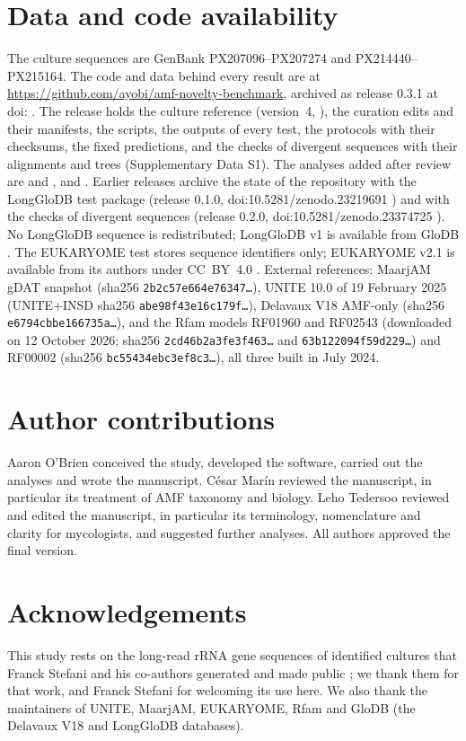 \documentclass[11pt]{article}
\begin{document}
\section*{Data and code availability}
The culture sequences are GenBank PX207096--PX207274 and PX214440--PX215164. The code and data behind every result
are at \url{https://github.com/ayobi/amf-novelty-benchmark}, archived as release 0.3.1 at doi:\ReleaseDOI{}
\cite{obrien2026zenodoc}. The release holds the culture reference (version~4, \RefFingerprint), the curation edits
and their manifests, the scripts, the outputs of every test, the protocols with their checksums, the fixed
predictions, and the checks of divergent sequences with their alignments and trees (Supplementary Data S1). The
analyses added after review are  and ,
 and . Earlier releases archive the state of the repository with the
LongGloDB test package (release 0.1.0, doi:10.5281/zenodo.23219691 \cite{obrien2026zenodo}) and with the checks of
divergent sequences (release 0.2.0, doi:10.5281/zenodo.23374725 \cite{obrien2026zenodob}). No LongGloDB sequence is
redistributed; LongGloDB v1 is available from GloDB \cite{glodb}. The EUKARYOME test stores sequence identifiers
only; EUKARYOME v2.1 is available from its authors under CC~BY~4.0 \cite{tedersoo2024eukaryome}. External references: MaarjAM
gDAT snapshot (sha256 \texttt{2b2c57e664e76347\ldots}), UNITE 10.0 of 19 February 2025 \cite{unite2025release}
(UNITE+INSD sha256 \texttt{abe98f43e16c179f\ldots}), Delavaux V18 AMF-only (sha256 \texttt{e6794cbbe166735a\ldots}),
and the Rfam models RF01960 and RF02543 (downloaded on 12 October 2026; sha256 \texttt{2cd46b2a3fe3f463\ldots} and
\texttt{63b122094f59d229\ldots}) and RF00002 (sha256 \texttt{bc55434ebc3ef8c3\ldots}), all three built in July 2024.

\section*{Author contributions}
Aaron O'Brien conceived the study, developed the software, carried out the analyses and wrote the manuscript.
C\'esar Mar\'in reviewed the manuscript, in particular its treatment of AMF taxonomy and biology. Leho Tedersoo
reviewed and edited the manuscript, in particular its terminology, nomenclature and clarity for mycologists, and
suggested further analyses. All authors approved the final version.

\section*{Acknowledgements}
This study rests on the long-read rRNA gene sequences of identified cultures that Franck Stefani and his co-authors
generated and made public \cite{stefani2025rdna}; we thank them for that work, and Franck Stefani for welcoming its
use here. We also thank the maintainers of UNITE, MaarjAM, EUKARYOME, Rfam and GloDB (the Delavaux V18 and
LongGloDB databases).
\end{document}
